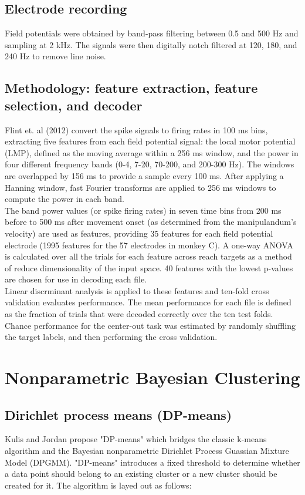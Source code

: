 \documentclass{article}
\begin{document}
\subsection{Electrode recording}
Field potentials were obtained by band-pass filtering between 0.5 and 500 Hz and sampling at 2 kHz.  The signals were then digitally notch filtered at 120, 180, and 240 Hz to remove line noise.  

\subsection{Methodology: feature extraction, feature selection, and decoder}
\noindent
Flint et. al (2012) convert the spike signals to firing rates in 100 ms bins, extracting five features from each field potential signal:  the local motor potential (LMP), defined as the moving average within a 256 ms window, and the power in four different frequency bands (0-4, 7-20, 70-200, and 200-300 Hz).  The windows are overlapped by 156 ms to provide a sample every 100 ms.  After applying a Hanning window, fast Fourier transforms are applied to 256 ms windows to compute the power in each band.   \\

\noindent
The band power values (or spike firing rates) in seven time bins from 200 ms before to 500 ms after movement onset (as determined from the manipulandum's velocity) are used as features, providing 35 features for each field potential electrode (1995 features for the 57 electrodes in monkey C).  A one-way ANOVA is calculated over all the trials for each feature across reach targets as a method of reduce dimensionality of the input space.  40 features with the lowest p-values are chosen for use in decoding each file.  \\

\noindent
Linear discrminant analysis is applied to these features and ten-fold cross validation evaluates performance.  The mean performance for each file is defined as the fraction of trials that were decoded correctly over the ten test folds.  Chance performance for the center-out task was estimated by randomly shuffling the target labels, and then performing the cross validation.

\section{Nonparametric Bayesian Clustering}

\subsection{Dirichlet process means (DP-means)}
Kulis and Jordan propose "DP-means" which bridges the classic k-means algorithm and the Bayesian nonparametric Dirichlet Process Guassian Mixture Model (DPGMM).  "DP-means" introduces a fixed threshold to determine whether a data point should belong to an existing cluster or a new cluster should be created for it.  The algorithm is layed out as follows: \\
\end{document}
